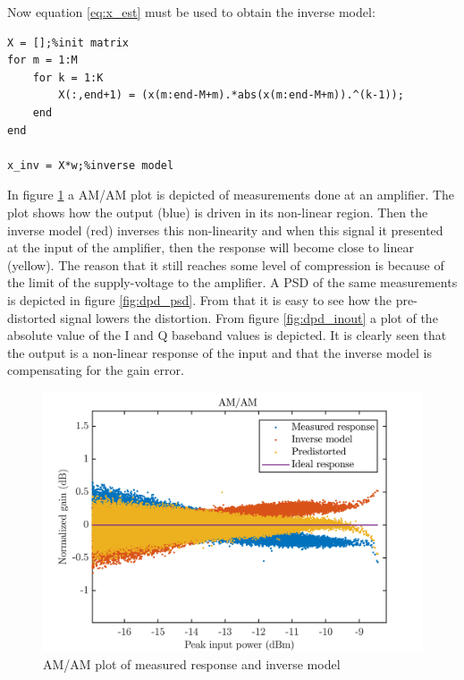 Now equation \ref{eq:x_est} must be used to obtain the inverse model:

\begin{lstlisting}[frame = single]
X = [];%init matrix
for m = 1:M
    for k = 1:K
        X(:,end+1) = (x(m:end-M+m).*abs(x(m:end-M+m)).^(k-1));
    end
end

x_inv = X*w;%inverse model
\end{lstlisting}


In figure \ref{fig:dpd_amam} a AM/AM plot is depicted of measurements done at an amplifier. The plot shows how the output (blue) is driven in its non-linear region. Then the inverse model (red) inverses this non-linearity and when this signal it presented at the input of the amplifier, then the response will become close to linear (yellow). The reason that it still reaches some level of compression is because of the limit of the supply-voltage to the amplifier. A PSD of the same measurements is depicted in figure \ref{fig:dpd_psd}. From that it is easy to see how the pre-distorted signal lowers the distortion. From figure \ref{fig:dpd_inout} a plot of the absolute value of the I and Q baseband values is depicted. It is clearly seen that the output is a non-linear response of the input and that the inverse model is compensating for the gain error.  


\begin{figure}[H]
\centering 
\includegraphics[scale = 0.7]{figures/measurement/predis.png}
\caption{AM/AM plot of measured response and inverse model}
\label{fig:dpd_amam}
\end{figure}

